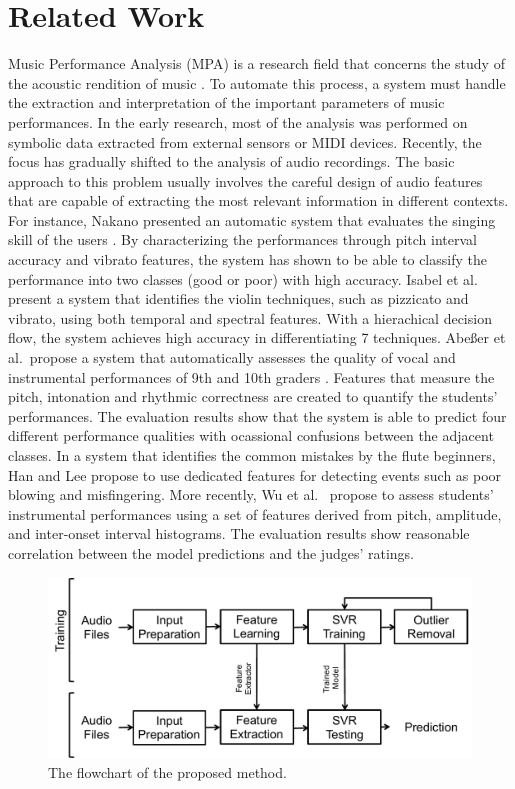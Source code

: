 \documentclass{article}
\begin{document}
\section{Related Work}\label{sec:relatedwork}
Music Performance Analysis (MPA) is a research field that concerns the study of the acoustic rendition of music \cite{lerch_software-based_2009}. To automate this process, a system must handle the extraction and interpretation of the important parameters of music performances. In the early research, most of the analysis was performed on symbolic data extracted from external sensors or MIDI devices. Recently, the focus has gradually shifted to the analysis of audio recordings. The basic approach to this problem usually involves the careful design of audio features that are capable of extracting the most relevant information in different contexts. For instance, Nakano presented an automatic system that evaluates the singing skill of the users \cite{Nakano2006a}. By characterizing the performances through pitch interval accuracy and vibrato features, the system has shown to be able to classify the performance into two classes (good or poor) with high accuracy. Isabel et al.~ present a system that identifies the violin techniques, such as pizzicato and vibrato, using both temporal and spectral features\cite{Barbancho2009}. With a hierachical decision flow, the system achieves high accuracy in differentiating 7 techniques. Abe{\ss}er et al.\ propose a system that automatically assesses the quality of vocal and instrumental performances of 9th and 10th graders \cite{Abeßer2013}. Features that measure the pitch, intonation and rhythmic correctness are created to quantify the students' performances. The evaluation results show that the system is able to predict four different performance qualities with ocassional confusions between the adjacent classes. In a system that identifies the common mistakes by the flute beginners, Han and Lee propose to use dedicated features for detecting events such as poor blowing and misfingering\cite{Han2014}. More recently, Wu et al.~ propose to assess students' instrumental performances using a set of features derived from pitch, amplitude, and inter-onset interval histograms\cite{Wu2016}. The evaluation results show reasonable correlation between the model predictions and the judges' ratings. 

\begin{figure}
\centering
\includegraphics[width = 8 cm]{./figs/flowchart.pdf}
\caption{The flowchart of the proposed method.}
\label{fig:flowchart}
\end{figure}
\end{document}
